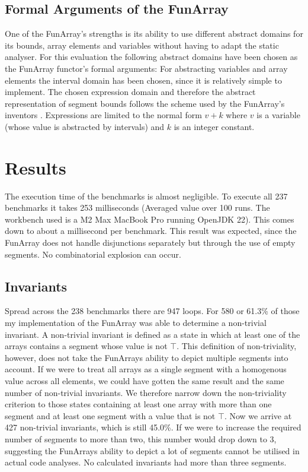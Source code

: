 \documentclass{report}
\begin{document}
\subsection{Formal Arguments of the FunArray}

One of the FunArray's strengths is its ability to use different abstract domains for its bounds, array elements and variables without having to adapt the static analyser. For this evaluation the following abstract domains have been chosen as the FunArray functor's formal arguments: For abstracting variables and array elements the interval domain has been chosen, since it is relatively simple to implement. The chosen expression domain and therefore the abstract representation of segment bounds follows the scheme used by the FunArray's inventors \cite[section 7.2]{cousot2011}. Expressions are limited to the normal form $v+k$ where $v$ is a variable (whose value is abstracted by intervals) and $k$ is an integer constant.

\section{Results}

The execution time of the benchmarks is almost negligible. To execute all 237 benchmarks it takes 253 milliseconds (Averaged value over 100 runs. The workbench used is a M2 Max MacBook Pro running OpenJDK 22). This comes down to about a millisecond per benchmark. This result was expected, since the FunArray does not handle disjunctions separately but through the use of empty segments. No combinatorial explosion can occur.

\subsection{Invariants}
Spread across the 238 benchmarks there are 947 loops. For 580 or 61.3\% of those my implementation of the FunArray was able to determine a non-trivial invariant. A non-trivial invariant is defined as a state in which at least one of the arrays contains a segment whose value is not $\top$.
This definition of non-triviality, however, does not take the FunArrays ability to depict multiple segments into account. If we were to treat all arrays as a single segment with a homogenous value across all elements, we could have gotten the same result and the same number of non-trivial invariants. We therefore narrow down the non-triviality criterion to those states containing at least one array with more than one segment and at least one segment with a value that is not $\top$. Now we arrive at 427 non-trivial invariants, which is still 45.0\%. 
If we were to increase the required number of segments to more than two, this number would drop down to 3, suggesting the FunArrays ability to depict a lot of segments cannot be utilised in actual code analyses. No calculated invariants had more than three segments.
\end{document}
